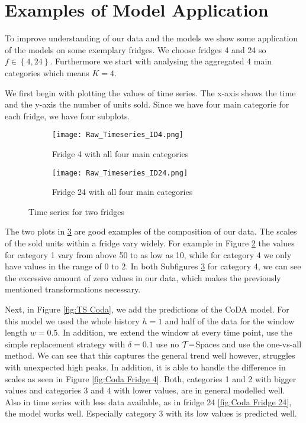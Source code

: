 \section{Examples of Model Application}
\label{sec:Examples of model application}

To improve understanding of our data and the models we show some application of the models on some exemplary fridges. We choose fridges 4 and 24 so $f \in \left\{4,24\right\}$. Furthermore we start with analysing the aggregated 4 main categories which means $K=4$. 

We first begin with plotting the values of time series. The x-axis shows the time and the y-axis the number of units sold. Since we have four main categorie for each fridge, we have four subplots. 

\begin{figure}[htb]
\centering
\begin{subfigure}[b]{0.45\textwidth}
\texttt{[image: Raw\_Timeseries\_ID4.png]} 
\caption{Fridge 4 with all four main categories}
\label{fig:TS Fridge 4}
\end{subfigure}
\hfill
\begin{subfigure}[b]{0.45\textwidth}
\texttt{[image: Raw\_Timeseries\_ID24.png]} 
\caption{Fridge 24 with all four main categories}
\label{fig:TS Fridge 24}
\end{subfigure}
\caption{Time series for two fridges}
\label{fig:TS raw}
\end{figure}


The two plots in \ref{fig:TS raw} are good examples of the composition of our data. The scales of the sold units within a fridge vary widely. For example in Figure \ref{fig:TS Fridge 24} the values for category 1 vary from above 50 to as low as 10, while for category 4 we only have values in the range of 0 to 2. In both Subfigures \ref{fig:TS raw} for category 4, we can see the excessive amount of zero values in our data, which makes the previously mentioned transformations necessary. 

Next, in Figure \ref{fig:TS Coda}, we add the predictions of the CoDA model. For this model we used the whole history $h=1$ and half of the data for the window length $w=0.5$. In addition, we extend the window at every time point, use the simple replacement strategy with $\delta=0.1$ use no $\mathcal{T}-$Spaces and use the one-vs-all method. We can see that this captures the general trend well however, struggles with unexpected high peaks. In addition, it is able to handle the difference in scales as seen in Figure \ref{fig:Coda Fridge 4}. Both, categories 1 and 2 with bigger values and categories 3 and 4 with lower values, are in general modelled well. Also in time series with less data available, as in fridge 24 \ref{fig:Coda Fridge 24}, the model works well. Especially category 3 with its low values is predicted well. 

